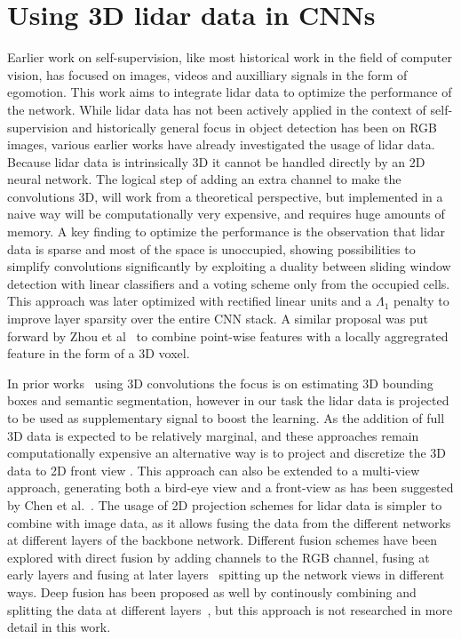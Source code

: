 \section{Using 3D lidar data in CNNs}
Earlier work on self-supervision, like most historical work in the field of computer vision, has focused on images, videos and auxilliary signals in the form of egomotion. This work aims to integrate lidar data to optimize the performance of the network. While lidar data has not been actively applied in the context of self-supervision and historically general focus in object detection has been on RGB images, various earlier works have already investigated the usage of lidar data. Because lidar data is intrinsically 3D it cannot be handled directly by an 2D neural network. The logical step of adding an extra channel to make the convolutions 3D, will work from a theoretical perspective, but implemented in a naive way will be computationally very expensive, and requires huge amounts of memory. A key finding to optimize the performance is the observation that lidar data is sparse and most of the space is unoccupied\cite{wang2015vote}, showing possibilities to simplify convolutions significantly by exploiting a duality between sliding window detection with linear classifiers and a voting scheme only from the occupied cells. This approach was later optimized with rectified linear units and a $\Lambda_1$ penalty to improve layer sparsity over the entire CNN stack\cite{engelcke2017}. A similar proposal was put forward by Zhou et al~\cite{zhou2017voxelnet} to combine point-wise features with a locally aggregrated feature in the form of a 3D voxel. 

In prior works~\cite{engelcke2017,zhou2017voxelnet,wang2015} using 3D convolutions the focus is on estimating 3D bounding boxes and semantic segmentation, however in our task the lidar data is projected to be used as supplementary signal to boost the learning. As the addition of full 3D data is expected to be relatively marginal, and these approaches remain computationally expensive\cite{chen2017} an alternative way is to project and discretize the 3D data to 2D front view \cite{li2016}. This approach can also be extended to a multi-view approach, generating both a bird-eye view and a front-view as has been suggested by Chen et al.~\cite{chen2017}. The usage of 2D projection schemes for lidar data is simpler to combine with image data, as it allows fusing the data from the different networks at different layers of the backbone network. Different fusion schemes have been explored with direct fusion by adding channels to the RGB channel, fusing at early layers and fusing at later layers~\cite{schlosser2016} spitting up the network views in different ways. Deep fusion has been proposed as well by continously combining and splitting the data at different layers~\cite{chen2017}, but this approach is not researched in more detail in this work.

